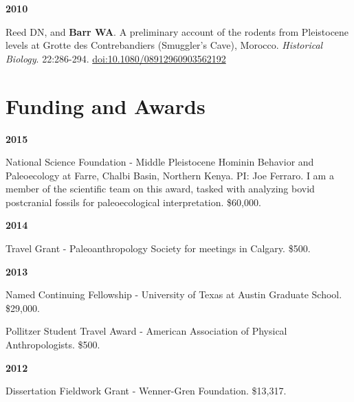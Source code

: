 \documentclass{article}
\begin{document}
\begin{description*}
\item[] {\bfseries 2010}
\item[] Reed DN, and {\bfseries Barr WA}. A preliminary account of the rodents from Pleistocene levels at Grotte des Contrebandiers (Smuggler's Cave),
Morocco. \emph{Historical Biology}. 22:286-294. \href{http://dx.doi.org/10.1080/08912960903562192}{doi:10.1080/08912960903562192}
\end{description*}


\section*{Funding and Awards}

\begin{minipage}{\linewidth}
\begin{description*}
\item[] {\bfseries 2015}
\item[] National Science Foundation - Middle Pleistocene Hominin Behavior and Paleoecology at Farre, Chalbi Basin, Northern Kenya. PI: Joe Ferraro. I am a member of the scientific team on this award, tasked with analyzing bovid postcranial fossils for paleoecological interpretation. \$60,000.
\end{description*}
\end{minipage}

\begin{description*}
\item[] {\bfseries 2014}
\item[] Travel Grant - Paleoanthropology Society for meetings in Calgary. \$500.
\end{description*}


\begin{description*}
\item[] {\bfseries 2013}
\item[] Named Continuing Fellowship - University of Texas at Austin Graduate School. \$29,000.
\item[] Pollitzer Student Travel Award - American Association of Physical Anthropologists. \$500.
\end{description*}


\begin{description*}
\item[] {\bfseries 2012}
\item[] Dissertation Fieldwork Grant - Wenner-Gren Foundation. \$13,317.
\end{description*}
\end{document}
